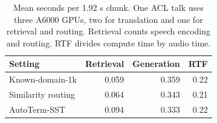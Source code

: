 \begin{table}[t]
\centering
\small
\begin{tabular}{lrrr}
\toprule
Setting & Retrieval & Generation & RTF \\
\midrule
Known-domain-1k & 0.059 & 0.359 & 0.22 \\
Similarity routing & 0.064 & 0.343 & 0.21 \\
AutoTerm-SST & 0.094 & 0.333 & 0.22 \\
\bottomrule
\end{tabular}
\caption{Mean seconds per 1.92 s chunk. One ACL talk uses three A6000 GPUs,
two for translation and one for retrieval and routing. Retrieval counts
speech encoding and routing. RTF divides compute time by audio time.}
\label{tab:speed}
\end{table}
